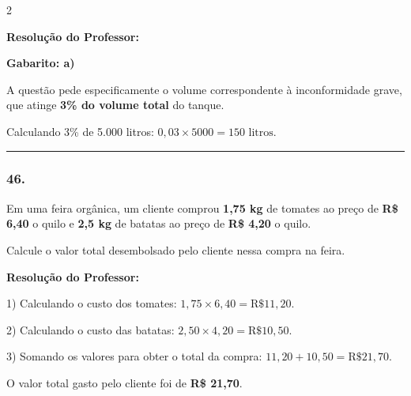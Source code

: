 \begin{multicols*}{2}
\ifgabarito
    \begin{tcolorbox}[colback=CorTitUm!5, colframe=CorTitUm, boxrule=1pt, arc=4pt, left=6pt, right=6pt, top=6pt, bottom=6pt]
    \small\textbf{\textcolor{CorTitUm}{Resolução do Professor:}}\par\vspace{0.1cm}
    \color{CinzaEscuro}
    \textbf{Gabarito: a)}
    
    A questão pede especificamente o volume correspondente à inconformidade grave, que atinge \textbf{3\% do volume total} do tanque.
    
    Calculando 3\% de 5.000 litros:
    $0,03 \times 5000 = 150\text{ litros}$.
    \end{tcolorbox}
\fi

\par\vspace{\espacoQuestao}
\noindent\textcolor{CorLinha}{\rule{\linewidth}{0.5pt}} 
\par\vspace{\espacoPreQuestao}
\subsubsection*{46.} Em uma feira orgânica, um cliente comprou \textbf{1,75 kg} de tomates ao preço de \textbf{R\$ 6,40} o quilo e \textbf{2,5 kg} de batatas ao preço de \textbf{R\$ 4,20} o quilo.

Calcule o valor total desembolsado pelo cliente nessa compra na feira.

\ifgabarito
    \begin{tcolorbox}[colback=CorTitUm!5, colframe=CorTitUm, boxrule=1pt, arc=4pt, left=6pt, right=6pt, top=6pt, bottom=6pt]
    \small\textbf{\textcolor{CorTitUm}{Resolução do Professor:}}\par\vspace{0.1cm}
    \color{CinzaEscuro}
    1) Calculando o custo dos tomates:
    $1,75 \times 6,40 = \text{R\$ } 11,20$.
    
    2) Calculando o custo das batatas:
    $2,50 \times 4,20 = \text{R\$ } 10,50$.
    
    3) Somando os valores para obter o total da compra:
    $11,20 + 10,50 = \text{R\$ } 21,70$.
    
    O valor total gasto pelo cliente foi de \textbf{R\$ 21,70}.
    \end{tcolorbox}
\fi

\par\vspace{\espacoQuestao}


\end{multicols*}
